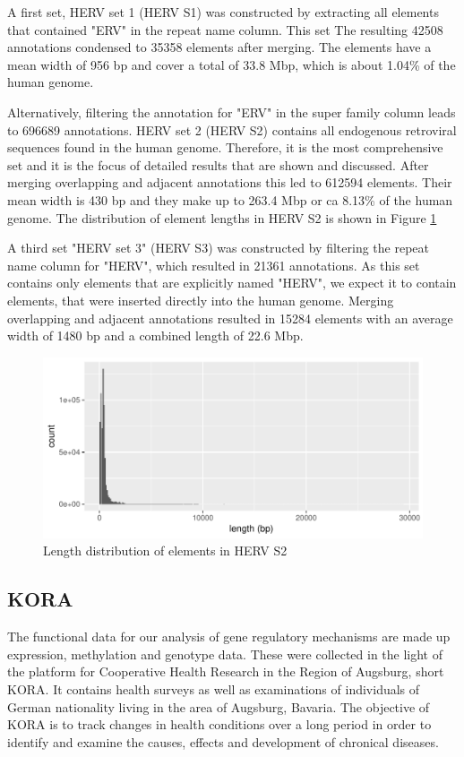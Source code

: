 \documentclass[a4paper,12pt,twoside,openright]{article}
\begin{document}
A first set, HERV set 1 (HERV S1) was constructed by extracting all elements that contained "ERV" in the repeat name column. This set
The resulting 42508 annotations condensed to 35358 elements after merging. The elements have a mean width of 956 bp and cover a total of 33.8 Mbp, which is about 1.04\% of the human genome.  

Alternatively, filtering the annotation for "ERV" in the super family column leads to 696689 annotations. HERV set 2 (HERV S2) contains all endogenous retroviral sequences found in the human genome. Therefore, it is the most comprehensive set and it is the focus of detailed results that are shown and discussed. After merging overlapping and adjacent annotations this led to 612594 elements. Their mean width is 430 bp and they make up to 263.4 Mbp or ca 8.13\% of the human genome. The distribution of element lengths in HERV S2 is shown in Figure \ref{fig:hervS2.length.hist} 

A third set "HERV set 3" (HERV S3) was constructed by filtering the repeat name column for "HERV", which resulted in 21361 annotations. As this set contains only elements that are explicitly named "HERV", we expect it to contain elements, that were inserted directly into the human genome. Merging overlapping and adjacent annotations resulted in 15284 elements with an average width of 1480 bp and a combined length of 22.6 Mbp.

\begin{figure}[tb]
	\includegraphics[scale = 1, keepaspectratio = true]{../figures/hervS2_length_hist}  
	\caption{Length distribution of elements in HERV S2}
    \label{fig:hervS2.length.hist}
\end{figure}


\subsection{KORA}
\label{Data:KORA}
The functional data for our analysis of gene regulatory mechanisms are made up expression, methylation and genotype data. These were collected in the light of the platform for Cooperative Health Research in the Region of Augsburg, short KORA. It contains health surveys as well as examinations of individuals of German nationality living in the area of Augsburg, Bavaria.
The objective of KORA is to track changes in health conditions over a long period in order to identify and examine the causes, effects and development of chronical diseases.
\end{document}
